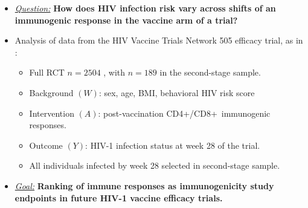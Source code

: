 \documentclass[landscape,a0paper,fontscale=0.285]{baposter} %
\newcommand{\compresslist}{ %
\setlength{\itemsep}{1pt}
\setlength{\parskip}{0pt}
\setlength{\parsep}{0pt}
}
\begin{document}
\begin{poster}
{\begin{itemize}\compresslist
\setlength\itemsep{0.5em}
\item \underline{\textit{Question:}} \textbf{How does HIV infection risk vary
  across shifts of an immunogenic response in the vaccine arm of a trial?}
\item Analysis of data from the HIV Vaccine Trials Network 505 efficacy trial,
  as in \cite{janes2017higher}:
  \begin{itemize}
    \itemsep0.25pt
    \item Full RCT $n = 2504$ , with $n = 189$ in the second-stage sample.
    \item Background $(W)$: sex, age, BMI, behavioral HIV risk score
    \item Intervention $(A)$: post-vaccination CD4+/CD8+~immunogenic responses.
    \item Outcome $(Y)$: HIV-1 infection status at week 28 of the trial.
    \item All individuals infected by week 28 selected in second-stage sample.
  \end{itemize}
\item \underline{\textit{Goal:}} \textbf{Ranking of immune responses as
    immunogenicity study endpoints in future HIV-1 vaccine efficacy trials.}
\end{itemize}
}


\end{poster}
\end{document}
